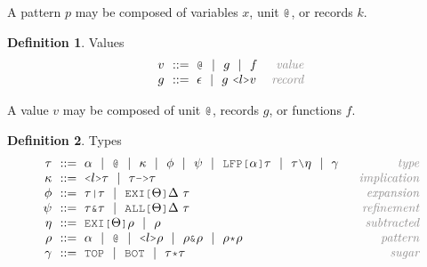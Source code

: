 \documentclass[acmsmall]{acmart}
\theoremstyle{definition}
\newtheorem{definition}{Definition}[section]
\begin{document}
\noindent
A pattern $p$ may be composed of variables $x$, unit $\J{@}$, or records $k$. 

\begin{definition} Values 
  \label{def:values}
  \[\begin{array}[t]{r@{}l@{}r}
    \nonterm{v} & \is 
      \J{@} \sep
      g \sep
      f
    & \com{value}
    \\
    \nonterm{g} & \is \epsilon \sep g\ \J{<}l\J{>}v
    & \com{record}
  \end{array}\]
\end{definition}

\noindent
A value $v$ may be composed of unit $\J{@}$, records $g$, or functions $f$. 

\begin{definition} Types 
  \label{def:types}
  \[\begin{array}[t]{r@{}l@{}r}
    \nonterm{\tau} & \is 
    \begin{array}[t]{@{}l}
      \alpha \sep
      \J{@} \sep
      \kappa \sep 
      \phi \sep 
      \psi \sep 
      \J{LFP[}\alpha\J{]}\tau \sep
      \tau \typdiff \eta \sep
      \gamma
    \end{array}
    & \com{type}
    \\
    \nonterm{\kappa} & \is 
    \begin{array}[t]{@{}l}
      \J{<} l \J{>} \tau \sep 
      \tau\J{->}\tau
    \end{array}
    & \com{implication}
    \\
    \nonterm{\phi} & \is 
    \begin{array}[t]{@{}l}
      \tau\J{|}\tau \sep 
      \J{EXI[}\Theta\J{]} \Delta\ \tau
    \end{array}
    & \com{expansion}
    \\
    \nonterm{\psi} & \is 
    \begin{array}[t]{@{}l}
      \tau\J{\&}\tau \sep 
      \J{ALL[}\Theta\J{]} \Delta\ \tau
    \end{array}
    & \com{refinement}
    \\
    \nonterm{\eta} & \is 
    \begin{array}[t]{@{}l}
      \J{EXI[}\Theta \J{]} \rho \sep 
      \rho
    \end{array}
    & \com{subtracted}
    \\
    \nonterm{\rho} & \is 
    \begin{array}[t]{@{}l}
      \alpha \sep
      \J{@} \sep
      \J{<}l\J{>}\rho \sep 
      \rho\J{\&}\rho \sep
      \rho\J{*}\rho
    \end{array}
    & \com{pattern}
    \\
    \nonterm{\gamma} & \is 
    \begin{array}[t]{@{}l}
      \J{TOP} \sep \J{BOT} \sep 
      \tau \J{*} \tau 
    \end{array}
    & \com{sugar}
  \end{array}\]
\end{definition}
\end{document}
